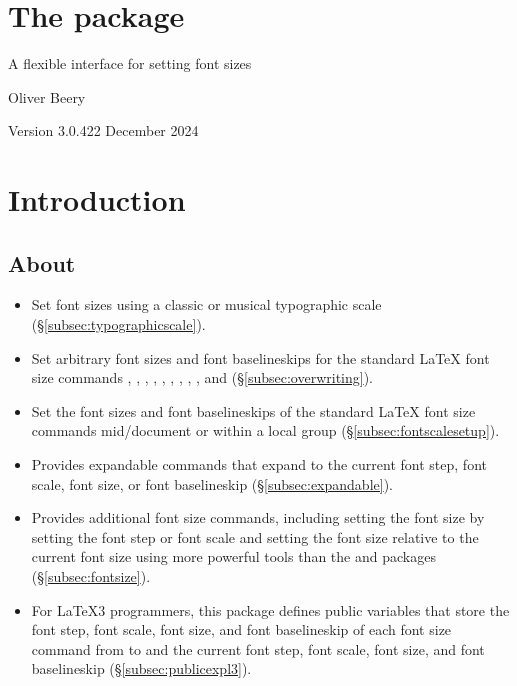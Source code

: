 \documentclass{beery}
\begin{document}
\section*
  {%
    The  package%
  }

A flexible interface for setting font sizes

Oliver Beery

Version 3.0.4\quad{}22 December 2024


\section{Introduction}
\label{sec:intro}

\subsection{About}
\label{subsec:about}

\begin{itemize}
  \item
  Set font sizes using a classic or musical typographic scale (\S\ref{subsec:typographicscale}).
  \item
  Set arbitrary font sizes and font baselineskips for the standard \LaTeX{} font size commands , , , , , , , , , and  (\S\ref{subsec:overwriting}).
  \item
  Set the font sizes and font baselineskips of the standard \LaTeX{} font size commands mid\-/document or within a local group (\S\ref{subsec:fontscalesetup}).
  \item
  Provides expandable commands that expand to the current font step, font scale, font size, or font baselineskip (\S\ref{subsec:expandable}).
  \item
  Provides additional font size commands, including setting the font size by setting the font step or font scale and setting the font size relative to the current font size using more powerful tools than the  and  packages (\S\ref{subsec:fontsize}).
  \item
  For \LaTeX3 programmers, this package defines public  variables that store the font step, font scale, font size, and font baselineskip of each font size command from  to  and the current font step, font scale, font size, and font baselineskip (\S\ref{subsec:publicexpl3}).
\end{itemize}
\end{document}
